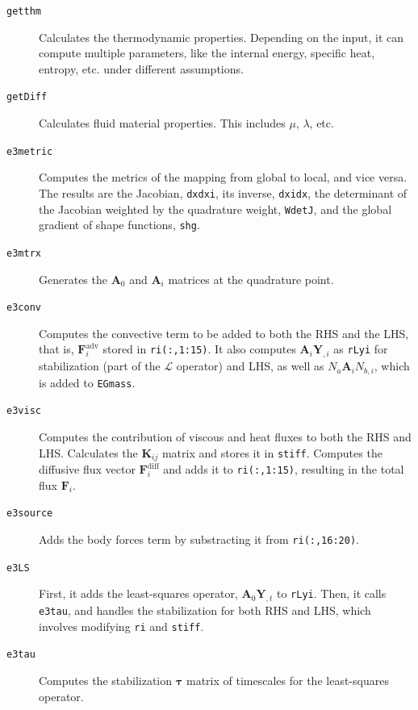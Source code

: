 \documentclass{ucb}
\begin{document}
\begin{description}
    \item[\texttt{getthm}] Calculates the thermodynamic properties. Depending on the input, it can compute multiple parameters, like the internal energy, specific heat, entropy, etc. under different assumptions.
    
    \item[\texttt{getDiff}] Calculates fluid material properties. This includes $\mu$, $\lambda$, etc.
    
    \item[\texttt{e3metric}] Computes the metrics of the mapping from global to local, and vice versa. The results are the Jacobian, \texttt{dxdxi}, its inverse, \texttt{dxidx}, the determinant of the Jacobian weighted by the quadrature weight, \texttt{WdetJ}, and the global gradient of shape functions, \texttt{shg}.
    
    \item[\texttt{e3mtrx}] Generates the $\bm{A}_0$ and $\bm{A}_i$ matrices at the quadrature point.
    
    \item[\texttt{e3conv}] Computes the convective term to be added to both the RHS and the LHS, that is, $\bm{F}_i^\mathrm{adv}$ stored in \texttt{ri(:,1:15)}. It also computes $\bm{A}_i \bm{Y}_{,i}$ as \texttt{rLyi} for stabilization (part of the $\mathcal{L}$ operator) and LHS, as well as $N_a \bm{A}_i N_{b,i}$, which is added to \texttt{EGmass}.
    
    \item[\texttt{e3visc}] Computes the contribution of viscous and heat fluxes to both the RHS and LHS. Calculates the $\bm{K}_{ij}$ matrix and stores it in \texttt{stiff}. Computes the diffusive flux vector $\bm{F}_i^\mathrm{diff}$ and adds it to \texttt{ri(:,1:15)}, resulting in the total flux $\bm{F}_i$.
    
    \item[\texttt{e3source}] Adds the body forces term by substracting it from \texttt{ri(:,16:20)}.
    
    \item[\texttt{e3LS}] First, it adds the least-squares operator, $\bm{A}_0 \bm{Y}_{,t}$ to \texttt{rLyi}. Then, it calls \texttt{e3tau}, and handles the stabilization for both RHS and LHS, which involves modifying \texttt{ri} and \texttt{stiff}.
    
    \item[\texttt{e3tau}] Computes the stabilization $\bm{\tau}$ matrix of timescales for the least-squares operator.
    

\end{description}
\end{document}
